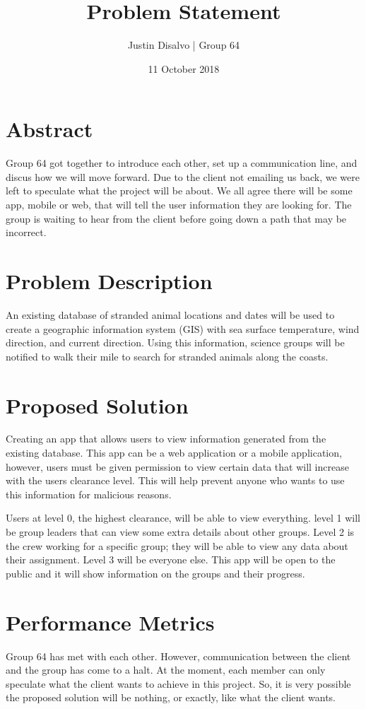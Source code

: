 \documentclass{article}
\title{Problem Statement}
\author{Justin Disalvo | Group 64}
\date{11 October 2018}
\begin{document}
\maketitle

\section{Abstract}
Group 64 got together to introduce each other, set up a communication line, and discus how we will move forward. Due to the client not emailing us back, we were left to speculate what the project will be about. We all agree there will be some app, mobile or web, that will tell the user information they are looking for. The group is waiting to hear from the client before going down a path that may be incorrect.

\section{Problem Description}
An existing database of stranded animal locations and dates will be used to create a geographic information system (GIS) with sea surface temperature, wind direction, and current direction. Using this information, science groups will be notified to walk their mile to search for stranded animals along the coasts.

\section{Proposed Solution}
Creating an app that allows users to view information generated from the existing database. This app can be a web application or a mobile application, however, users must be given permission to view certain data that will increase with the users clearance level. This will help prevent anyone who wants to use this information for malicious reasons.\newline 

\noindent Users at level 0, the highest clearance, will be able to view everything. level 1 will be group leaders that can view some extra details about other groups. Level 2 is the crew working for a specific group; they will be able to view any data about their assignment. Level 3 will be everyone else. This app will be open to the public and it will show information on the groups and their progress.

\section{Performance Metrics}
Group 64 has met with each other. However, communication between the client and the group has come to a halt. At the moment, each member can only speculate what the client wants to achieve in this project. So, it is very possible the proposed solution will be nothing, or exactly, like what the client wants.
\end{document}

